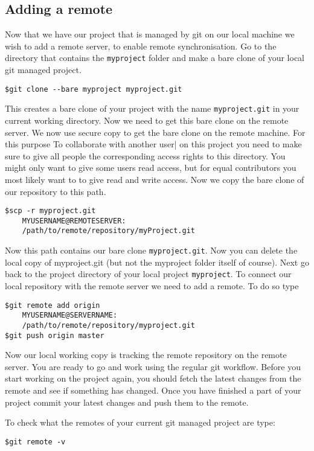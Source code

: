 \documentclass{article}
\begin{document}
\subsection{Adding a remote}
Now that we have our project that is managed by git on our local machine we wish to add a remote server, to enable remote synchronisation.
Go to the directory that contains the \verb|myproject| folder and make a bare clone of your local git managed project.
\begin{lstlisting}
$git clone --bare myproject myproject.git
\end{lstlisting}
This creates a bare clone of your project with the name \verb|myproject.git| in your current working directory. Now we need to get this bare clone on the remote server. We now use secure copy to get the bare clone on the remote machine. For this purpose 
To collaborate with another user| on this project you need to make sure to give all people the corresponding access rights to this directory. You might only want to give some users read access, but for equal contributors you most likely want to to give read and write access.
Now we copy the bare clone of our repository to this path.
\begin{lstlisting}
$scp -r myproject.git
	MYUSERNAME@REMOTESERVER:
	/path/to/remote/repository/myProject.git
\end{lstlisting}
Now this path contains our bare clone \verb|myproject.git|.
Now you can delete the local copy of myproject.git (but not the myproject folder itself of course).
Next go back to the project directory of your local project \verb|myproject|.
To connect our local repository with the remote server we need to add a remote. To do so type
\begin{lstlisting}
$git remote add origin
	MYUSERNAME@SERVERNAME:
	/path/to/remote/repository/myproject.git
$git push origin master
\end{lstlisting}
Now our local working copy is tracking the remote repository on the remote server.
You are ready to go and work using the regular git workflow.
Before you start working on the project again, you should fetch the latest changes from the remote and see if something has changed. Once you have finished a part of your project commit your latest changes and push them to the remote.

\noindent
To check what the remotes of your current git managed project are type:
\begin{lstlisting}
$git remote -v
\end{lstlisting}
\end{document}
